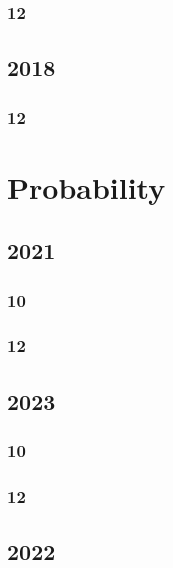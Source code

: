 \documentclass[11pt]{book}
\begin{document}
\subsection{12}


\section{2018}
\subsection{12}


%





\chapter{Probability}
\section{2021}
\subsection{10}

\subsection{12}

\section{2023}
\subsection{10}

\subsection{12}

\section{2022}
\end{document}
